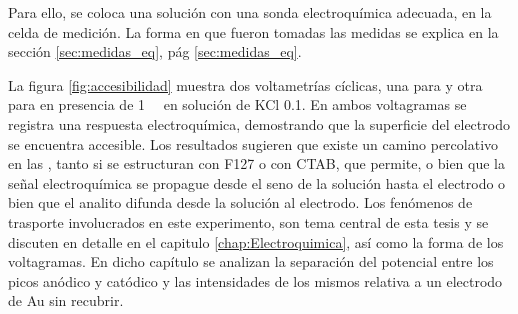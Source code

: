 			Para ello, se coloca una solución con una sonda electroquímica adecuada, en la celda de medición. La forma en que fueron tomadas las medidas se explica en la sección \ref{sec:medidas_eq}, pág \ref{sec:medidas_eq}. 

			La figura \ref{fig:accesibilidad} muestra dos voltametrías cíclicas, una para \pdmF\space y otra para \pdmC en presencia de \aminorutenio\space \SI{1}{\milli\Molar} en solución de KCl \SI{0.1}{\Molar}. En ambos voltagramas se registra una respuesta electroquímica, demostrando que la superficie del electrodo se encuentra accesible. Los resultados sugieren que existe un camino percolativo en las \pdm, tanto si se estructuran con F127 o con CTAB, que permite, o bien que la señal electroquímica se propague desde el seno de la solución hasta el electrodo o bien que el analito difunda desde la solución al electrodo. Los fenómenos de trasporte involucrados en este experimento, son tema central de esta tesis y se discuten en detalle en el capitulo \ref{chap:Electroquimica}, así como la forma de los voltagramas. En dicho capítulo se analizan la separación del potencial entre los picos anódico y catódico y las intensidades de los mismos relativa a un electrodo de Au sin recubrir. 

